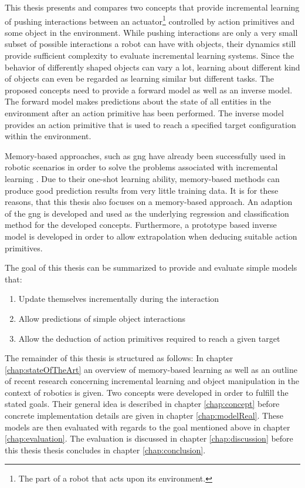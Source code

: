 This thesis presents and compares two concepts that provide incremental learning of pushing interactions between an actuator\footnote{The part of a robot that acts upon its environment.} controlled by action primitives and some object in the environment.
While pushing interactions are only a very small subset of possible interactions a robot can have with objects, their dynamics still provide sufficient complexity to evaluate incremental learning systems. Since the behavior of differently shaped objects can vary a lot, learning about different kind of objects can even be regarded as learning similar but different tasks. 
The proposed concepts need to provide a forward model as well as an inverse model. The forward model makes predictions about the state of all entities in the environment after an action primitive has been performed. The inverse model provides an action primitive that is used to reach a specified target configuration within the environment.

Memory-based approaches, such as \gls{gng} have already been successfully used in robotic scenarios in order to solve the problems associated with incremental learning \cite{carlevarino2000incremental}. Due to their one-shot learning ability, memory-based methods can produce good prediction results from very little training data. It is for these reasons, that this thesis also focuses on a memory-based approach. An adaption of the \gls{gng} is developed and used as the underlying regression and classification method for the developed concepts. Furthermore, a prototype based inverse model is developed in order to allow extrapolation when deducing suitable action primitives.

The goal of this thesis can be summarized to provide and evaluate simple models that:

\begin{enumerate}
	\item Update themselves incrementally during the interaction
	\item Allow predictions of simple object interactions %
	\item Allow the deduction of action primitives required to reach a given target
\end{enumerate}

The remainder of this thesis is structured as follows: In chapter \ref{chap:stateOfTheArt} an overview of memory-based learning as well as an outline of recent research concerning incremental learning and object manipulation in the context of robotics is given. Two concepts were developed in order to fulfill the stated goals. Their general idea is described in chapter \ref{chap:concept} before concrete implementation details are given in chapter \ref{chap:modelReal}. These models are then evaluated with regards to the goal mentioned above in chapter \ref{chap:evaluation}. The evaluation is discussed in chapter \ref{chap:discussion} before this thesis thesis concludes in chapter \ref{chap:conclusion}.

